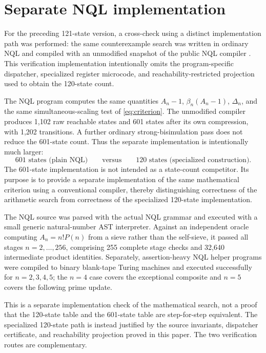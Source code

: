 \documentclass[10pt]{article}
\theoremstyle{definition}
\begin{document}
\section{Separate NQL implementation}
\label{sec:nqlcheck}

For the preceding 121-state version, a cross-check using a distinct implementation path was performed: the same counterexample search was
written in ordinary NQL and compiled with an unmodified snapshot of the public
NQL compiler \cite{NQL}. This verification implementation intentionally omits
the program-specific dispatcher, specialized register microcode, and
reachability-restricted projection used to obtain the 120-state count.

The NQL program computes the same quantities $A_n-1$, $\beta_n(A_n-1)$,
$\Delta_n$, and the same simultaneous-scaling test of \cref{eq:criterion}. The
unmodified compiler produces 1,102 raw reachable states and 601 states after
its own compression, with 1,202 transitions. A further ordinary
strong-bisimulation pass does not reduce the 601-state count. Thus the
separate implementation is intentionally much larger:
\[
601\text{ states (plain NQL)}\qquad\text{versus}\qquad120\text{ states (specialized construction)}.
\]
The 601-state implementation is not intended as a state-count competitor. Its
purpose is to provide a separate implementation of the same mathematical
criterion using a conventional compiler, thereby distinguishing correctness of
the arithmetic search from correctness of the specialized 120-state
implementation.

The NQL source was parsed with the actual NQL grammar and executed with a
small generic natural-number AST interpreter. Against an independent oracle
computing $A_n=n!P(n)$ from a sieve rather than the self-sieve, it passed all
stages $n=2,\ldots,256$, comprising 255 complete stage checks and 32,640
intermediate product identities. Separately, assertion-heavy NQL helper
programs were compiled to binary blank-tape Turing machines and executed
successfully for $n=2,3,4,5$; the $n=4$ case covers the exceptional composite
and $n=5$ covers the following prime update.

This is a separate implementation check of the mathematical search, not a
proof that the 120-state table and the 601-state table are step-for-step
equivalent. The specialized 120-state path is instead justified by the source
invariants, dispatcher certificate, and reachability projection proved in this
paper. The two verification routes are complementary.
\end{document}

